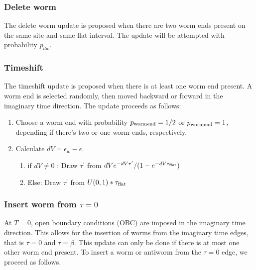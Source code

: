 \documentclass[12pt, two sided]{article}
\begin{document}
    \subsubsection{Delete worm}
    The delete worm update is proposed when there are two worm ends present on the same site and same flat interval. The update will be attempted with probability $p_{dw}$.
    
    \subsubsection{Timeshift}
    The timeshift update is proposed when there is at least one worm end present. A worm end is selected randomly, then moved backward or forward in the imaginary time direction. The update proceeds as follows:
    \begin{enumerate}
    \item{Choose a worm end with probability $p_{\rm{wormend}}=1/2$ or $p_{\rm{wormend}}=1$, depending if there's two or one worm ends, respectively.}
    \item{Calculate $dV=\epsilon_{w}-\epsilon$.}
    \begin{enumerate}
    \item{if $dV \neq 0$ : Draw $\tau^\prime$ from $dV e^{-dV\tau^\prime}/(1-e^{-dV \tau_{\rm{flat}}})$}
    \item{Else: Draw $\tau^\prime$ from $U(0,1)*\tau_{\rm{flat}}$}
    \end{enumerate}
    \end{enumerate}

    \subsubsection{Insert worm from $\tau=0$}
    
    At $T=0$, open boundary conditions (OBC) are imposed in the imaginary time direction.  This allows for the insertion of worms from the imaginary time edges, that is $\tau=0$ and $\tau=\beta$. This update can only be done if there is at most one other worm end present. To insert a worm or antiworm from the $\tau=0$ edge, we proceed as follows.
    
\end{document}
